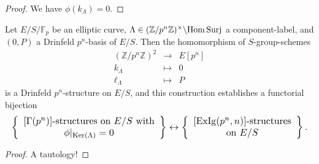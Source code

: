 \begin{proof}
We have $\phi(k_\Lambda) = 0$.
\end{proof}

\begin{kprop}\label{prop:13.7.5}
Let $E/S/\mathbb{F}_p$ be an elliptic curve, $\Lambda \in (\mathbb{Z}/p^n\mathbb{Z})^\times \backslash \mathrm{Hom\,Surj}$ a component-label, and $(0,P)$ a Drinfeld $p^n$-basis of $E/S$. Then the homomorphism of $S$-group-schemes
\[
\begin{array}{rcl}
(\mathbb{Z}/p^n\mathbb{Z})^2 & \to & E[p^n] \\
k_\Lambda & \mapsto & 0 \\
\ell_\Lambda & \mapsto & P
\end{array}
\]
is a Drinfeld $p^n$-structure on $E/S$, and this construction establishes a functorial bijection
\[
\resizebox{\linewidth}{!}{$\displaystyle
\left\{\begin{array}{c}
[\Gamma(p^n)]\text{-structures on } E/S \text{ with} \\
\phi|_{\Ker(\Lambda)} = 0
\end{array}\right\}
\leftrightarrow
\left\{\begin{array}{c}
[\mathrm{ExIg}(p^n,n)]\text{-structures} \\
\text{on } E/S
\end{array}\right\} .$}
\]
\end{kprop}

\begin{proof}
A tautology!
\end{proof}

